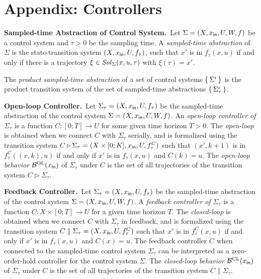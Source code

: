 \section{Appendix: Controllers}
\label{sec:controllers}
\smallskip
\noindent\textbf{Sampled-time Abstraction of Control System.}\
Let $\Sigma = (X, x_{\mathsf{in}}, U, W, f)$ be a control system and $\tau>0$ be the sampling time.
A \emph{sampled-time abstraction} of $\Sigma$ is the state-transition system $(X,x_{\mathsf{in}},U,f_\tau)$, such that $x'$ is in $f_\tau(x,u)$ if and only if there is a trajectory $\xi\in \mathit{Sol}_\Sigma(x,u,\tau)$ with $\xi(\tau)=x'$.

The \emph{product sampled-time abstraction} of a set of control systems $\set{\Sigma^i} $ is the product transition system of the set of sampled-time abstractions $\set{\Sigma^i_\tau} $.

\smallskip
\noindent\textbf{Open-loop Controller.}\
Let $\Sigma_\tau=(X,x_{\mathsf{in}},U,f_\tau)$ be the sampled-time abstraction of the control system $\Sigma=(X,x_{\mathsf{in}},U,W,f)$.
An \emph{open-loop controller of} $\Sigma_\tau$ is a function $C\colon [0;T]\to U$ for some given time horizon $T>0$.
The \emph{open-loop} is obtained when we connect $C$ with $\Sigma_\tau$ serially, and is formalized using the transition system $C \triangleright \Sigma_\tau = (X\times [0;K],x_{\mathsf{in}},U,f_\tau^C)$ such that $(x',k+1)$ is in $f_\tau^C((x,k),u)$ if and only if $x'$ is in $f_\tau(x,u)$ and $C(k)=u$.
The \emph{open-loop behavior} $\mathcal{B}^{\mathrm{OL}}(x_{\mathsf{in}})$ of $\Sigma_\tau$ under $C$ is the set of all trajectories of the transition system $C \triangleright \Sigma_\tau$.

\smallskip
\noindent\textbf{Feedback Controller.}\
Let $\Sigma_\tau=(X,x_{\mathsf{in}},U,f_\tau)$ be the sampled-time abstraction of the control system $\Sigma=(X,x_{\mathsf{in}},U,W,f)$.
A \emph{feedback controller of} $\Sigma_\tau$ is a function $C\colon X\times[0;T]\to U$ for a given time horizon $T$.
The \emph{closed-loop} is obtained when we connect $C$ with $\Sigma_\tau$ in feedback, and is formalized using the transition system $C\parallel\Sigma_\tau = (X,x_{\mathsf{in}},U,f_\tau^C)$ such that $x'$ is in $f_\tau^C(x,u)$ if and only if $x'$ is in $f_\tau(x,u)$ and $C(x)=u$.
The feedback controller $C$ when connected to the sampled-time control system $\Sigma_\tau$ can be interpreted as a zero-order-hold controller for the control system $\Sigma$.
The \emph{closed-loop behavior} $\mathcal{B}^{\mathrm{CL}}(x_{\mathsf{in}})$ of $\Sigma_\tau$ under $C$ is the set of all trajectories of the transition system $C\parallel\Sigma_\tau$.

